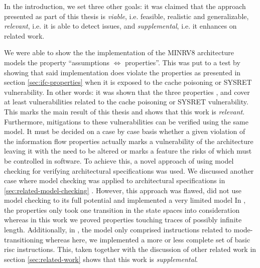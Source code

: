 In the introduction, we set three other goals: it was claimed that the approach presented as part of this thesis is \textit{viable}, i.e. feasible, realistic and generalizable, \textit{relevant}, i.e. it is able to detect issues, and \textit{supplemental}, i.e. it enhances on related work.

We were able to show the the implementation of the MINRV8 architecture models the property \enquote{assumptions $ \Leftrightarrow $ properties}.
This was put to a test by showing that said implementation does violate the properties as presented in section \ref{sec:ifc-properties} when it is exposed to the cache poisoning or SYSRET vulnerability.
In other words: it was shown that the three properties ,  and  cover at least vulnerabilities related to the cache poisoning or SYSRET vulnerability.
This marks the main result of this thesis and shows that this work is \textit{relevant}.
Furthermore, mitigations to these vulnerabilities can be verified using the same model.
It must be decided on a case by case basis whether a given violation of the information flow properties actually marks a vulnerability of the architecture leaving it with the need to be altered or marks a feature the risks of which must be controlled in software.
To achieve this, a novel approach of using model checking for verifying architectural specifications was used.
We discussed another case where model checking was applied to architectural specifications in \ref{sec:related-model-checking} \cite{BradfieldS16}.
However, this approach was flawed, did not use model checking to its full potential and implemented a very limited model
In \cite{BradfieldS16}, the properties only took one transition in the state spaces into consideration whereas in this work we proved properties touching traces of possibly infinite length.
Additionally, in \cite{BradfieldS16}, the model only comprised instructions related to mode-transitioning whereas here, we implemented a more or less complete set of basic \gls{risc} instructions.
This, taken together with the discussion of other related work in section \ref{sec:related-work} shows that this work is \textit{supplemental}.

